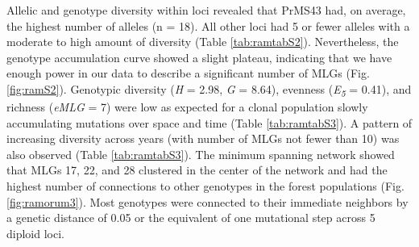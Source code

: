 \documentclass[double,11pt]{beavtex}
\begin{document}
  Allelic and genotype diversity within loci revealed that PrMS43 had, on
  average, the highest number of alleles (n = 18). All other loci had 5 or
  fewer alleles with a moderate to high amount of diversity (Table
  \ref{tab:ramtabS2}). Nevertheless, the genotype accumulation curve
  showed a slight plateau, indicating that we have enough power in our
  data to describe a significant number of MLGs (Fig. \ref{fig:ramS2}).
  Genotypic diversity (\emph{H} = 2.98, \emph{G} = 8.64), evenness
  (\emph{E\textsubscript{5}} = 0.41), and richness (\emph{eMLG} = 7) were
  low as expected for a clonal population slowly accumulating mutations
  over space and time (Table \ref{tab:ramtabS3}). A pattern of increasing
  diversity across years (with number of MLGs not fewer than 10) was also
  observed (Table \ref{tab:ramtabS3}). The minimum spanning network showed
  that MLGs 17, 22, and 28 clustered in the center of the network and had
  the highest number of connections to other genotypes in the forest
  populations (Fig. \ref{fig:ramorum3}). Most genotypes were connected to
  their immediate neighbors by a genetic distance of 0.05 or the
  equivalent of one mutational step across 5 diploid loci.
  
\end{document}
